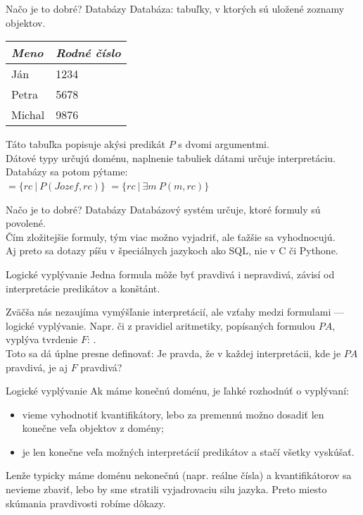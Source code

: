 \documentclass[12pt]{beamer}
\theoremstyle{definition}
\let\E\exists
\begin{document}
\begin{frame}{Načo je to dobré? Databázy}
Databáza: tabuľky, v ktorých sú uložené zoznamy objektov.
\begin{table}[h!]
    \centering
	\begin{tabular}{|l|l|}
        \hline
        \emph{Meno} & \emph{Rodné číslo} \\
        \hline
        Ján & 1234 \\
        Petra & 5678 \\
        Michal & 9876 \\
        \hline
    \end{tabular}
\end{table}
Táto tabuľka popisuje akýsi predikát $P$ s dvomi argumentmi.\\
Dátové typy určujú doménu, naplnenie tabuliek dátami určuje interpretáciu.\\[3mm]
Databázy sa potom pýtame:\\[2mm]
 $ = \{rc\ |\ P(Jozef, rc)\}$
\hspace*{21.5mm} $ = \{rc\ |\ \E m\ P(m, rc)\}$
\end{frame}

\begin{frame}{Načo je to dobré? Databázy}
Databázový systém určuje, ktoré formuly sú povolené.\\
Čím zložitejšie formuly, tým viac možno vyjadriť, ale ťažšie sa vyhodnocujú.\\[3mm]
Aj preto sa dotazy píšu v špeciálnych jazykoch ako SQL, nie v C či Pythone.
\end{frame}

\begin{frame}{Logické vyplývanie}
Jedna formula môže byť pravdivá i nepravdivá, závisí od interpretácie predikátov a konštánt.

Zväčša nás nezaujíma vymýšľanie interpretácií, ale vzťahy medzi formulami
--- logické vyplývanie. Napr. či z pravidiel aritmetiky, popísaných formulou $PA$, vyplýva tvrdenie $F$: .\\[2mm]

Toto sa dá úplne presne definovať:
\alert{Je pravda, že v každej interpretácii, kde je $PA$ pravdivá, je aj $F$ pravdivá?}
\end{frame}

\begin{frame}{Logické vyplývanie}
Ak máme konečnú doménu, je ľahké rozhodnúť o vyplývaní:
\begin{itemize}
\item vieme vyhodnotiť kvantifikátory, lebo za premennú možno dosadiť len konečne veľa objektov z domény;
\item je len konečne veľa možných interpretácií predikátov a stačí všetky vyskúšať.
\end{itemize}
Lenže typicky máme doménu nekonečnú (napr. reálne čísla) a kvantifikátorov sa nevieme zbaviť, lebo by sme stratili vyjadrovaciu silu jazyka. Preto miesto skúmania pravdivosti robíme dôkazy.
\end{frame}
\end{document}
